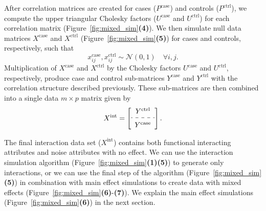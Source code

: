 \documentclass[10pt,letterpaper]{article}
\begin{document}
After correlation matrices are created for cases ($P^\text{case}$) and controls ($P^\text{ctrl}$), we compute the upper triangular Cholesky factors ($U^\text{case}$ and $U^\text{ctrl}$) for each correlation matrix (Figure~\ref{fig:mixed_sim}\textbf{(4)}). We then simulate null data matrices $X^\text{case}$ and $X^\text{ctrl}$  (Figure~\ref{fig:mixed_sim}\textbf{(5)}) for cases and controls, respectively, such that 
\begin{equation}\label{eq:null_case_ctrl}
x^\text{case}_{ij}, x^\text{ctrl}_{ij} \sim \mathcal{N}(0,1) \quad \forall i,j.
\end{equation}
Multiplication of $X^\text{case}$ and $X^\text{ctrl}$ by the Cholesky factors $U^\text{case}$ and $U^\text{ctrl}$, respectively, produce case and control sub-matrices $Y^\text{case}$ and $Y^\text{ctrl}$ with the correlation structure described previously. These sub-matrices are then combined into a single data $m \times p$ matrix given by
%
\begin{equation}\label{eq:full_interaction_data}
X^\text{int} = \left[
\begin{array}{c}
Y^\text{ctrl} \\ [0.5ex]
\hdashline \\ [-1.7ex]
Y^\text{case}
\end{array}
\right].
\end{equation}
%

The final interaction data set ($X^\text{int}$) contains both functional interacting attributes and noise attributes with no effect. We can use the interaction simulation algorithm (Figure~\ref{fig:mixed_sim}\textbf{(1)}\textbf{(5)}) to generate only interactions, or we can use the final step of the algorithm (Figure~\ref{fig:mixed_sim}\textbf{(5)}) in combination with main effect simulations to create data with mixed effects (Figure~\ref{fig:mixed_sim}\textbf{(6)}-\textbf{(7)}). We explain the main effect simulations (Figure~\ref{fig:mixed_sim}\textbf{(6)}) in the next section.

\end{document}
